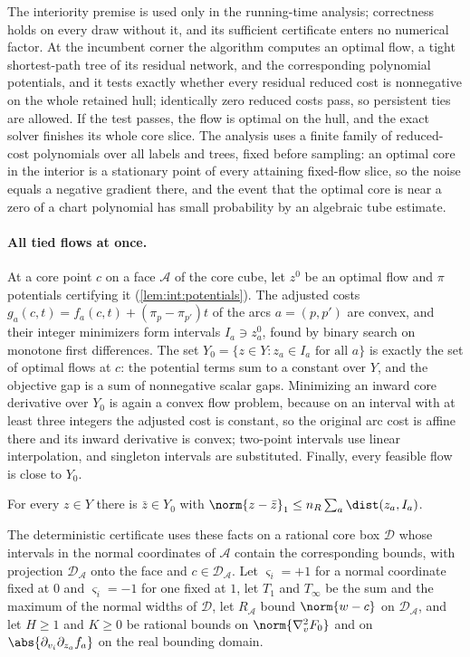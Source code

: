 The interiority premise is used only in the running-time analysis;
correctness holds on every draw without it, and its sufficient certificate
enters no numerical factor. At the incumbent corner the algorithm computes an
optimal flow, a tight shortest-path tree of its residual network, and the
corresponding polynomial potentials, and it tests exactly whether every
residual reduced cost is nonnegative on the whole retained hull; identically
zero reduced costs pass, so persistent ties are allowed. If the test passes,
the flow is optimal on the hull, and the exact solver finishes its whole core
slice. The analysis uses a finite family of reduced-cost polynomials over all
labels and trees, fixed before sampling: an optimal core in the interior is a
stationary point of every attaining fixed-flow slice, so the noise equals a
negative gradient there, and the event that the optimal core is near a zero
of a chart polynomial has small probability by an algebraic tube estimate.

\paragraph{All tied flows at once.}
At a core point $c$ on a face $\mathcal A$ of the core cube, let $z^0$ be an
optimal flow and $\pi$ potentials certifying it (\cref{lem:int:potentials}).
The adjusted costs $g_a(c,t)=f_a(c,t)+(\pi_p-\pi_{p'})t$ of the arcs $a=(p,p')$
are convex, and their integer minimizers form intervals $I_a\ni z^0_a$, found
by binary search on monotone first differences. The set
$Y_0=\{z\in Y:z_a\in I_a\text{ for all }a\}$ is exactly the set of optimal flows
at $c$: the potential terms sum to a constant over $Y$, and the objective gap is
a sum of nonnegative scalar gaps. Minimizing an inward core derivative over
$Y_0$ is again a convex flow problem, because on an interval with at least
three integers the adjusted cost is constant, so the original arc cost is
affine there and its inward derivative is convex; two-point intervals use
linear interpolation, and singleton intervals are substituted. Finally, every
feasible flow is close to $Y_0$.

\begin{lemma}\label{lem:int:proximity}
For every $z\in Y$ there is $\bar z\in Y_0$ with
$\norm{z-\bar z}_1\le n_R\sum_a\dist(z_a,I_a)$.
\end{lemma}

The deterministic certificate uses these facts on a rational core box
$\mathcal D$ whose intervals in the normal coordinates of $\mathcal A$ contain
the corresponding bounds, with projection $\mathcal D_{\mathcal A}$ onto the
face and $c\in\mathcal D_{\mathcal A}$. Let $\varsigma_i=+1$ for a normal
coordinate fixed at $0$ and $\varsigma_i=-1$ for one fixed at $1$, let $T_1$ and
$T_\infty$ be the sum and the maximum of the normal widths of $\mathcal D$, let
$R_{\mathcal A}$ bound $\norm{w-c}$ on $\mathcal D_{\mathcal A}$, and let
$H\ge1$ and $K\ge0$ be rational bounds on $\norm{\nabla^2_vF_0}$ and on
$\abs{\partial_{v_i}\partial_{z_a}f_a}$ on the real bounding domain.

